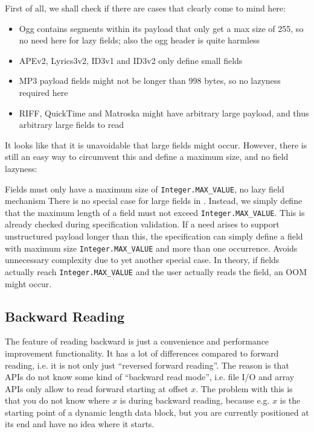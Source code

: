 First of all, we shall check if there are cases that clearly come to mind here:
\begin{itemize}
\item Ogg contains segments within its payload that only get a max size of 255, so no need here for lazy fields; also the ogg header is quite harmless
\item APEv2, Lyrics3v2, ID3v1 and ID3v2 only define small fields
\item MP3 payload fields might not be longer than 998 bytes, so no lazyness required here
\item RIFF, QuickTime and Matroska might have arbitrary large payload, and thus arbitrary large fields to read
\end{itemize}

It looks like that it is unavoidable that large fields might occur. However, there is still an easy way to circumvent this and define a maximum size, and no field lazyness:

{%
Fields must only have a maximum size of \texttt{Integer.MAX\_VALUE}, no lazy field mechanism 
}
{%
There is no special case for large fields in \LibName{}. Instead, we simply define that the maximum length of a field must not exceed \texttt{Integer.MAX\_VALUE}. This is already checked during specification validation. If a need arises to support unstructured payload longer than this, the specification can simply define a field with maximum size \texttt{Integer.MAX\_VALUE} and more than one occurrence.
}
{%
Avoids unnecessary complexity due to yet another special case.
}
{%
In theory, if fields actually reach \texttt{Integer.MAX\_VALUE} and the user actually reads the field, an OOM might occur.
}

\subsection{Backward Reading}%
\label{sec:BackwardReading}%

The feature of reading backward is just a convenience and performance improvement functionality. It has a lot of differences compared to forward reading, i.e. it is not only just ``reversed forward reading''. The reason is that APIs do not know some kind of ``backward read mode'', i.e. file I/O and array APIs only allow to read forward starting at offset $x$. The problem with this is that you do not know where $x$ is during backward reading, because e.g. $x$ is the starting point of a dynamic length data block, but you are currently positioned at its end and have no idea where it starts.

